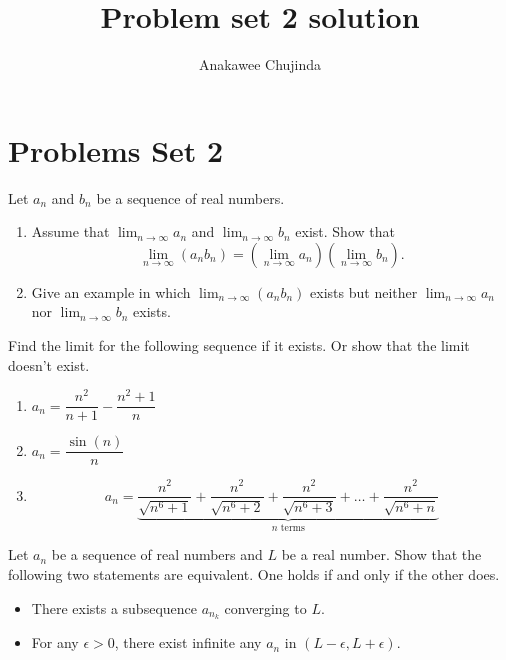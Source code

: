 \documentclass[11pt]{article}
\title{Problem set 2 solution}
\author{Anakawee Chujinda}
\begin{document}
\maketitle
\newpage

\section{Problems Set 2}
\begin{problem}[25pt]
  Let $a_n$ and $b_n$ be a sequence of real numbers.
  \begin{enumerate}
    \item Assume that $\lim_{n \to \infty} a_n$ and $\lim_{n \to \infty} b_n$ exist. Show that
      \[
        \lim_{n \to \infty} (a_n b_n)
        = \left( \lim_{n \to \infty} a_n \right) \left( \lim_{n \to \infty} b_n \right).
      \]
    \item Give an example in which $\lim_{n \to \infty} (a_n b_n)$ exists but neither
      $\lim_{n \to \infty} a_n$ nor $\lim_{n \to \infty} b_n$ exists.
  \end{enumerate}
\end{problem}

\begin{problem}[25pt]
  Find the limit for the following sequence if it exists. Or show that the limit doesn't
  exist.
  \begin{enumerate}
    \item $a_n = \dfrac{n^2}{n+1} - \dfrac{n^2+1}{n}$
    \item $a_n = \dfrac{\sin(n)}{n}$
    \item \[
        a_n = \underbrace{\frac{n^2}{\sqrt{n^6+1}} + \frac{n^2}{\sqrt{n^6+2}}
          + \frac{n^2}{\sqrt{n^6+3}} + \dots + \frac{n^2}{\sqrt{n^6+n}}}_{n \text{ terms}}
      \]
  \end{enumerate}
\end{problem}

\begin{problem}[15pt]
  Let $a_n$ be a sequence of real numbers and $L$ be a real number. Show that the following
  two statements are equivalent. One holds if and only if the other does.
  \begin{itemize}
    \item There exists a subsequence $a_{n_k}$ converging to $L$.
    \item For any $\epsilon > 0$, there exist infinite any $a_n$ in $(L - \epsilon, L + \epsilon)$.
  \end{itemize}
\end{problem}
\end{document}
